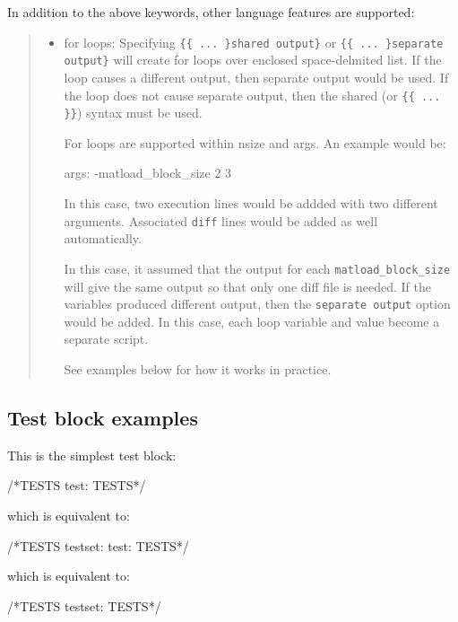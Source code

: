 In addition to the above keywords, other language features are
supported:
%
\begin{quote}
%
\begin{itemize}

\item for loops:  Specifying \lstinline!{{ ... }shared output}!
      or \lstinline!{{ ... }separate output}!
      will create for loops over enclosed space-delmited list.
      If the loop causes a different output, then separate output would
      be used.  If the loop does not cause separate output, then the
      shared (or \lstinline!{{ ... }}!) syntax must be used.

For loops are supported within nsize and args.  An example would be:
%
\begin{outputlisting}
args: -matload_block_size {{2 3}}
\end{outputlisting}

In this case, two execution lines would be addded with two different
arguments.  Associated \lstinline{diff} lines would be added as well
automatically.

In this case, it assumed that the output for each
\lstinline{matload_block_size} will give the same output so
that only one diff file is needed.  If the variables
produced different output, then the \lstinline{separate output} option would be added.  In this case, each loop
variable and value become a separate script.

See examples below for how it works in practice.

\end{itemize}

\end{quote}


\subsection{Test block examples%
  \label{test-block-examples}%
}


This is the simplest test block:
%
\begin{outputlisting}
/*TESTS
  test:
TESTS*/
\end{outputlisting}
which is equivalent to:
\begin{outputlisting}
/*TESTS
  testset:
    test:
TESTS*/
\end{outputlisting}
which is equivalent to:
\begin{outputlisting}
/*TESTS
  testset:
TESTS*/
\end{outputlisting}

